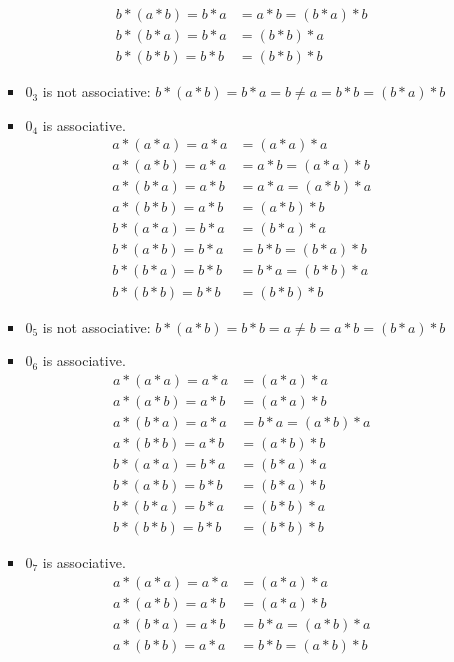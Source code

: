 \begin{enumerate}[label={\Alph*.},font={\bfseries}]
\begin{enumerate}[label={\arabic*},font={\bfseries}]
\begin{itemize}
\begin{align*}
              b*(a*b) = b*a &= a*b = (b*a)*b \\
              b*(b*a) = b*a &= (b*b)*a \\
              b*(b*b) = b*b &= (b*b)*b
            \end{align*}
          \item $0_3$ is not associative: $b*(a*b)=b*a=b \neq a=b*b=(b*a)*b$
          \item $0_4$ is associative.
            \begin{align*}
              a*(a*a) = a*a &= (a*a)*a \\
              a*(a*b) = a*a &= a*b = (a*a)*b \\
              a*(b*a) = a*b &= a*a = (a*b)*a \\
              a*(b*b) = a*b &= (a*b)*b \\
              b*(a*a) = b*a &= (b*a)*a \\
              b*(a*b) = b*a &= b*b = (b*a)*b \\
              b*(b*a) = b*b &= b*a = (b*b)*a \\
              b*(b*b) = b*b &= (b*b)*b
            \end{align*}
          \item $0_5$ is not associative: $b*(a*b)=b*b=a \neq b=a*b=(b*a)*b$
          \item $0_6$ is associative.
            \begin{align*}
              a*(a*a) = a*a &= (a*a)*a\\
              a*(a*b) = a*b &= (a*a)*b\\
              a*(b*a) = a*a &= b*a = (a*b)*a \\
              a*(b*b) = a*b &= (a*b)*b \\
              b*(a*a) = b*a &= (b*a)*a \\
              b*(a*b) = b*b &= (b*a)*b \\
              b*(b*a) = b*a &= (b*b)*a \\
              b*(b*b) = b*b &= (b*b)*b
            \end{align*}
          \item $0_7$ is associative.
            \begin{align*}
              a*(a*a) = a*a &= (a*a)*a \\
              a*(a*b) = a*b &= (a*a)*b \\
              a*(b*a) = a*b &= b*a = (a*b)*a \\
              a*(b*b) = a*a &= b*b = (a*b)*b \\

\end{align*}
\end{itemize}
\end{enumerate}
\end{enumerate}
